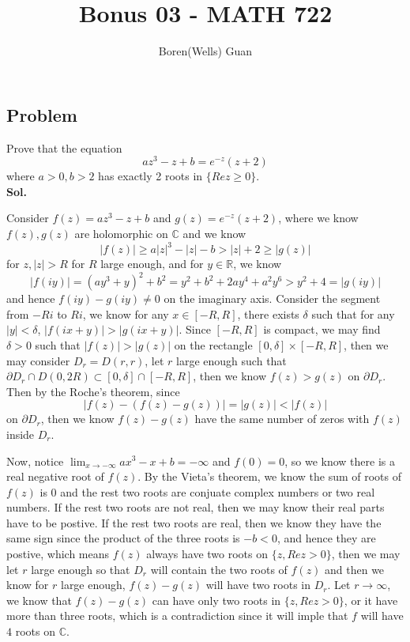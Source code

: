 \documentclass[lang=en,11pt,a4paper,citestyle =authoryear]{elegantpaper}
\title{Bonus 03 - MATH 722}
\author{Boren(Wells) Guan}
\newcommand{\R}{\mathbb{R}}
\newcommand{\C}{\mathbb{C}}
\begin{document}
\maketitle

\subsection*{Problem} 
Prove that the equation
\[az^3 - z + b = e^{-z}(z+2)\]
where $a>0, b>2$ has exactly 2 roots in $\{Re z\geq 0\}$.
\vspace{0.5em}\\
\textbf{Sol.} \par
Consider $f(z) = az^3 - z +b$ and $g(z) = e^{-z}(z+2)$, where we know $f(z),g(z)$ are holomorphic on $\C$ and we know
\[
|f(z)| \geq a|z|^3 - |z| - b > |z|+2 \geq |g(z)|
\]
for $z, |z|>R$ for $R$ large enough, and for $y\in \R$, we know
\[
|f(iy)| = (ay^3+y)^2 + b^2 = y^2+b^2 + 2ay^4 + a^2y^6 > y^2+4 = |g(iy)|
\]
and hence $f(iy) - g(iy) \neq 0$ on the imaginary axis. Consider the segment from $-Ri$ to $Ri$, we know for any $x\in[-R,R]$, there exists $\delta$ such that for any $|y|<\delta$, $|f(ix+y)| > |g(ix+y)|$. Since $[-R,R]$ is compact, we may find $\delta > 0$ such that $|f(z)| > |g(z)|$ on the rectangle $[0,\delta]\times[-R,R]$, then we may consider $D_r = D(r,r)$, let $r$ large enough such that $\partial D_r\cap D(0,2R) \subset [0,\delta]\cap[-R,R]$, then we know $f(z)> g(z)$ on $\partial D_r$. Then by the Roche's theorem, since
\[
|f(z)-(f(z)-g(z))| = |g(z)| < |f(z)|
\]
on $\partial D_r$, then we know $f(z)-g(z)$ have the same number of zeros with $f(z)$ inside $D_r$.\par
Now, notice $\lim_{x\to-\infty} ax^3-x+b = -\infty$ and $f(0) = 0$, so we know there is a real negative root of $f(z)$. By the Vieta's theorem, we know the sum of roots of $f(z)$ is $0$ and the rest two roots are conjuate complex numbers or two real numbers. If the rest two roots are not real, then we may know their real parts have to be postive. If the rest two roots are real, then we know they have the same sign since the product of the three roots is $-b<0$, and hence they are postive, which means $f(z)$ always have two roots on $\{z, Re z > 0\}$, then we may let $r$ large enough so that $D_r$ will contain the two roots of $f(z)$ and then we know for $r$ large enough, $f(z)- g(z)$ will have two roots in $D_r$. Let $r\to\infty$, we know that $f(z)-g(z)$ can have only two roots in $\{z,Re z > 0\}$, or it have more than three roots, which is a contradiction since it will imple that $f$ will have $4$ roots on $\C$.
\par 
\vspace{0.5em}

\addappheadtotoc
\end{document}
